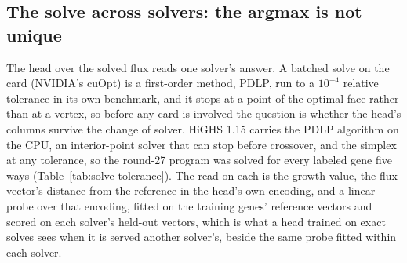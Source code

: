 
\subsection{The solve across solvers: the argmax is not unique}
\label{sec:solve-tolerance}

The head over the solved flux reads one solver's answer. A batched solve on the card
(NVIDIA's cuOpt) is a first-order method, PDLP, run to a $10^{-4}$ relative tolerance
in its own benchmark, and it stops at a point of the optimal face rather than at a
vertex, so before any card is involved the question is whether the head's columns
survive the change of solver. HiGHS 1.15 carries the PDLP algorithm on the CPU, an
interior-point solver that can stop before crossover, and the simplex at any
tolerance, so the round-27 program was solved for every labeled gene five ways
(Table~\ref{tab:solve-tolerance}). The read on each is the growth value, the
flux vector's distance from the reference in the head's own encoding, and a linear
probe over that encoding, fitted on the training genes' reference vectors and scored
on each solver's held-out vectors, which is what a head trained on exact solves sees
when it is served another solver's, beside the same probe fitted within each solver.




